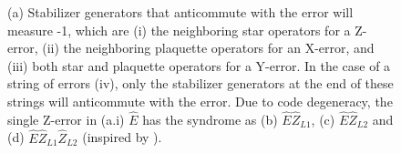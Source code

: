 \begin{figure}[htbp]
    \hspace{1cm}
    \caption{(a) Stabilizer generators that anticommute with the error will measure -1, which are (i) the neighboring star operators for a Z-error, (ii) the neighboring plaquette operators for an X-error, and (iii) both star and plaquette operators for a Y-error. In the case of a string of errors (iv), only the stabilizer generators at the end of these strings will anticommute with the error. Due to code degeneracy, the single Z-error in (a.i) $\hat{E}$ has the syndrome as (b) $\hat{E}\hat{Z}_{L1}$, (c) $\hat{E}\hat{Z}_{L2}$ and (d) $\hat{E}\hat{Z}_{L1}\hat{Z}_{L2}$ (inspired by \cite{browne}).}\label{sf:fig_degenerate}
  \end{figure}